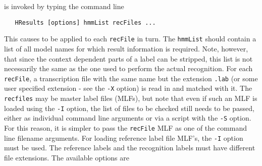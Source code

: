  is invoked by typing the command line
\begin{verbatim}
   HResults [options] hmmList recFiles ...
\end{verbatim}
This causes  to be applied to each {\tt recFile} in turn.  The
{\tt hmmList} should contain a list of all model names for which result
information is required.  Note, however, that since the context dependent parts
of a label can be stripped, this list is not necessarily the same as the one
used to perform the actual recognition.  For each {\tt recFile}, a
transcription file with the same name but the extension {\tt .lab} (or some
user specified extension - see the {\tt -X} option) is read in and matched with
it. The {\tt recfiles} may be master label files (MLFs), but note that even if  such an MLF is loaded using the {\tt -I} option, the list of files to be checked still needs to be passed, either as individual command line arguments or via a script with the {\tt -S} option. For this reason, it is simpler to pass the {\tt recFile} MLF as one of the command line filename arguments. For loading reference label file MLF's, the {\tt -I} option must be used. The reference labels and the recognition labels must have different file extensions.
The available options are
